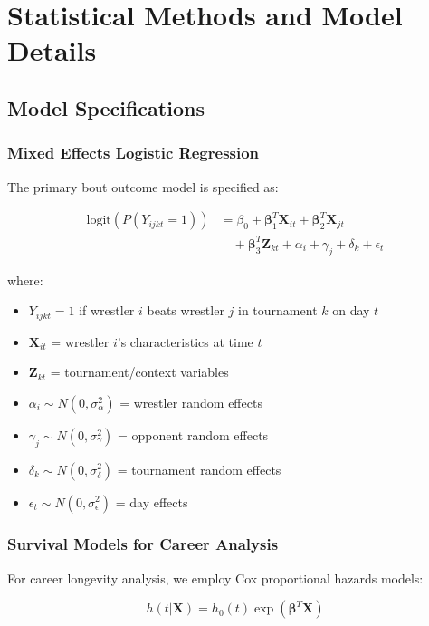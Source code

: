 \chapter{Statistical Methods and Model Details}

\section{Model Specifications}

\subsection{Mixed Effects Logistic Regression}

The primary bout outcome model is specified as:

\begin{align}
\text{logit}(P(Y_{ijkt} = 1)) &= \beta_0 + \boldsymbol{\beta}_1^T \mathbf{X}_{it} + \boldsymbol{\beta}_2^T \mathbf{X}_{jt} \\
&\quad + \boldsymbol{\beta}_3^T \mathbf{Z}_{kt} + \alpha_i + \gamma_j + \delta_k + \epsilon_t
\end{align}

where:
\begin{itemize}
\item $Y_{ijkt} = 1$ if wrestler $i$ beats wrestler $j$ in tournament $k$ on day $t$
\item $\mathbf{X}_{it}$ = wrestler $i$'s characteristics at time $t$
\item $\mathbf{Z}_{kt}$ = tournament/context variables
\item $\alpha_i \sim N(0, \sigma_{\alpha}^2)$ = wrestler random effects
\item $\gamma_j \sim N(0, \sigma_{\gamma}^2)$ = opponent random effects  
\item $\delta_k \sim N(0, \sigma_{\delta}^2)$ = tournament random effects
\item $\epsilon_t \sim N(0, \sigma_{\epsilon}^2)$ = day effects
\end{itemize}

\subsection{Survival Models for Career Analysis}

For career longevity analysis, we employ Cox proportional hazards models:

\begin{equation}
h(t|\mathbf{X}) = h_0(t) \exp(\boldsymbol{\beta}^T \mathbf{X})
\end{equation}

